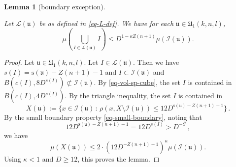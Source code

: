 \documentclass[10pt,a4paper]{article}
\theoremstyle{plain}
\newtheorem{lemma}[theorem]{Lemma}
\theoremstyle{definition}
\numberwithin{equation}{subsection}
\newcommand{\fu}{{\mathfrak u}}
\newcommand{\fU}{{\mathfrak U}}
\newcommand{\ps}{{\mathrm{s}}}
\newcommand{\scI}{{\mathcal{I}}} %
\newcommand{\lean}[1]{}
\newcommand{\leanok}{}
\begin{document}
\begin{lemma}[boundary exception]
\label{boundary-exception}
\leanok
\lean{boundary_exception}

Let $\mathcal{L}(\fu)$ be as defined in \eqref{eq-L-def}. We have for each $\fu\in \fU_1(k,n,l)$,
\begin{equation}
\mu(\bigcup_{I\in \mathcal{L}(\fu)} I)
\le D^{1-\kappa Z(n+1)}
        \mu(\scI(\mathfrak{u})).
\end{equation}
\end{lemma}
\begin{proof}
\leanok
Let $\fu\in \fU_1(k,n,l)$.
Let $I \in \mathcal{L}(\fu)$. Then we have $s(I) = \ps(\fu) - Z(n+1) - 1$ and $I \subset \scI(\fu)$ and $B(c(I), 8D^{s(I)}) \not \subset \scI(\fu)$.
By \eqref{eq-vol-sp-cube}, the set $I$
is contained in $B(c(I), 4D^{s(I)})$.
By the triangle inequality, the set $I$
is contained in
\begin{equation}
    X(\fu):=\{x \in \scI(\fu) \, : \, \rho(x, X \setminus \scI(\fu)) \leq 12 D^{\ps(\fu) - Z(n+1)-1}\}\,.
\end{equation}
 By the small boundary property \eqref{eq-small-boundary}, noting that
 \begin{equation*}
     12D^{\ps(\fu) - Z(n+1) - 1} = 12D^{s(I)} > D^{-S}\ ,
 \end{equation*} we have
   $$
        \mu(X(\fu)) \le
        2\cdot(12 D^{-Z(n+1)-1})^\kappa
        \mu(\scI(\mathfrak{u})).
    $$
Using $\kappa<1$ and $D \ge 12$, this proves the lemma.
\end{proof}
\end{document}

